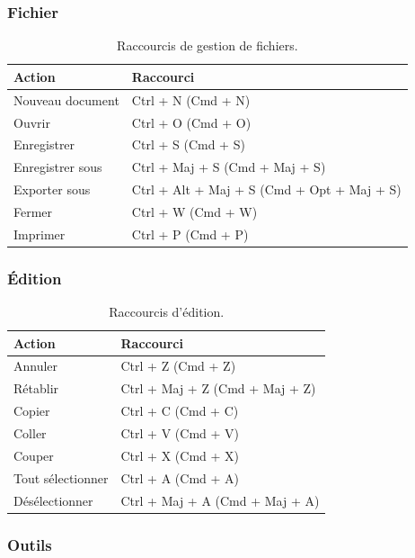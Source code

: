 \subsubsection{Fichier}

\begin{table}[h!]
\centering
\begin{tabular}{@{}ll@{}}
\toprule
\textbf{Action} & \textbf{Raccourci} \\
\midrule
Nouveau document & Ctrl + N (Cmd + N) \\
Ouvrir & Ctrl + O (Cmd + O) \\
Enregistrer & Ctrl + S (Cmd + S) \\
Enregistrer sous & Ctrl + Maj + S (Cmd + Maj + S) \\
Exporter sous & Ctrl + Alt + Maj + S (Cmd + Opt + Maj + S) \\
Fermer & Ctrl + W (Cmd + W) \\
Imprimer & Ctrl + P (Cmd + P) \\
\bottomrule
\end{tabular}
\caption{Raccourcis de gestion de fichiers.}
\end{table}

\subsubsection{Édition}

\begin{table}[h!]
\centering
\begin{tabular}{@{}ll@{}}
\toprule
\textbf{Action} & \textbf{Raccourci} \\
\midrule
Annuler & Ctrl + Z (Cmd + Z) \\
Rétablir & Ctrl + Maj + Z (Cmd + Maj + Z) \\
Copier & Ctrl + C (Cmd + C) \\
Coller & Ctrl + V (Cmd + V) \\
Couper & Ctrl + X (Cmd + X) \\
Tout sélectionner & Ctrl + A (Cmd + A) \\
Désélectionner & Ctrl + Maj + A (Cmd + Maj + A) \\
\bottomrule
\end{tabular}
\caption{Raccourcis d'édition.}
\end{table}

\subsubsection{Outils}

